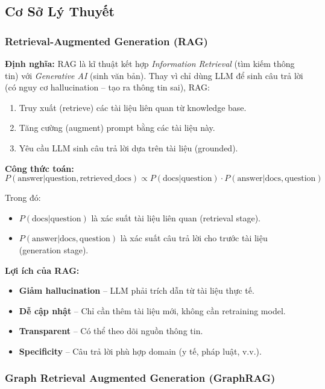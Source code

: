 \documentclass[12pt,a4paper]{article}
\begin{document}
\subsection{Cơ Sở Lý Thuyết}

\subsubsection{Retrieval-Augmented Generation (RAG)}

\textbf{Định nghĩa:} RAG là kĩ thuật kết hợp \textit{Information Retrieval} (tìm kiếm thông tin) với \textit{Generative AI} (sinh văn bản). Thay vì chỉ dùng LLM để sinh câu trả lời (có nguy cơ hallucination – tạo ra thông tin sai), RAG:

\begin{enumerate}
    \item Truy xuất (retrieve) các tài liệu liên quan từ knowledge base.
    \item Tăng cường (augment) prompt bằng các tài liệu này.
    \item Yêu cầu LLM sinh câu trả lời dựa trên tài liệu (grounded).
\end{enumerate}

\textbf{Công thức toán:}
$$P(\text{answer}|\text{question}, \text{retrieved\_docs}) \propto P(\text{docs}|\text{question}) \cdot P(\text{answer}|\text{docs}, \text{question})$$

Trong đó:
\begin{itemize}
    \item $P(\text{docs}|\text{question})$ là xác suất tài liệu liên quan (retrieval stage).
    \item $P(\text{answer}|\text{docs}, \text{question})$ là xác suất câu trả lời cho trước tài liệu (generation stage).
\end{itemize}

\textbf{Lợi ích của RAG:}
\begin{itemize}
    \item \textbf{Giảm hallucination} – LLM phải trích dẫn từ tài liệu thực tế.
    \item \textbf{Dễ cập nhật} – Chỉ cần thêm tài liệu mới, không cần retraining model.
    \item \textbf{Transparent} – Có thể theo dõi nguồn thông tin.
    \item \textbf{Specificity} – Câu trả lời phù hợp domain (y tế, pháp luật, v.v.).
\end{itemize}

\subsubsection{Graph Retrieval Augmented Generation (GraphRAG)}
\end{document}
